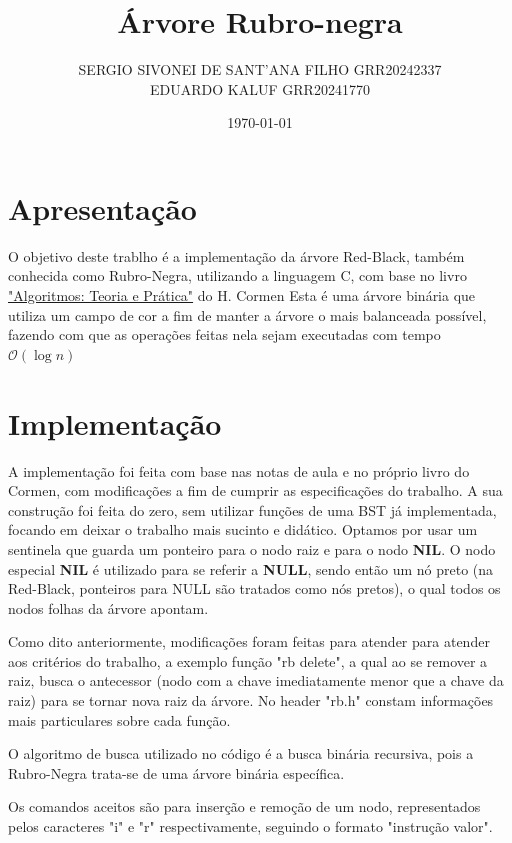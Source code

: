 \documentclass{article}
\title{Árvore Rubro-negra}
\author{SERGIO SIVONEI DE SANT'ANA FILHO GRR20242337\\EDUARDO KALUF GRR20241770}
\date{\today}
\begin{document}
    \maketitle
    
    \section{Apresentação}
    
    \parindent=10pt O objetivo deste trablho é a implementação da árvore Red-Black, também conhecida como Rubro-Negra, utilizando a linguagem C, com base no livro \href{https://computerscience360.wordpress.com/wp-content/uploads/2018/02/algoritmos-teoria-e-prc3a1tica-3ed-thomas-cormen.pdf}{"Algoritmos: Teoria e Prática"} do H. Cormen
    \parindent=10pt Esta é uma árvore binária que utiliza um campo de cor a fim de manter a árvore o mais balanceada possível, fazendo com que as operações feitas nela sejam executadas com tempo $\mathcal{O}(\log n)$

    \section{Implementação}

    \parindent=10pt A implementação foi feita com base nas notas de aula e no próprio livro do Cormen, com modificações a fim de cumprir as especificações do trabalho. A sua construção foi feita do zero, sem utilizar funções de uma BST já implementada, focando em deixar o trabalho mais sucinto e didático.
    \parindent=10pt Optamos por usar um sentinela que guarda um ponteiro para o nodo raiz e para o nodo \textbf{NIL}. O nodo especial \textbf{NIL} é utilizado para se referir a \textbf{NULL}, sendo então um nó preto (na Red-Black, ponteiros para NULL são tratados como nós pretos), o qual todos os nodos folhas da árvore apontam.

    \parindent=10pt Como dito anteriormente, modificações foram feitas para atender para atender aos critérios do trabalho, a exemplo função "rb delete", a qual ao se remover a raiz, busca o antecessor (nodo com a chave imediatamente menor que a chave da raiz) para se tornar nova raiz da árvore. No header "rb.h" constam informações mais particulares sobre cada função.

    \parindent=10pt O algoritmo de busca utilizado no código é a busca binária recursiva, pois a Rubro-Negra trata-se de uma árvore binária específica.

    \parindent=10pt Os comandos aceitos são para inserção e remoção de um nodo, representados pelos caracteres "i" e "r" respectivamente, seguindo o formato "instrução valor". 
\end{document}
